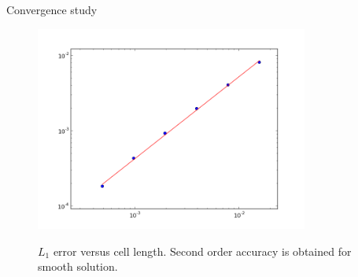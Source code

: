 \documentclass{beamer}
\begin{document}
\begin{frame}{Convergence study}
\begin{figure}
  \centering
  \includegraphics[width=0.8\textwidth]{loglog_error.png}\\
  \caption{$L_1$ error versus cell length. Second order accuracy is obtained for smooth solution.}\label{conv}
\end{figure}
\end{frame}
\end{document}
